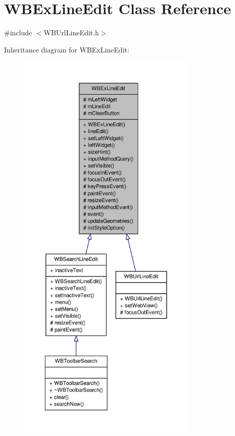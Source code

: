 \hypertarget{class_w_b_ex_line_edit}{\section{W\-B\-Ex\-Line\-Edit Class Reference}
\label{d6/dbb/class_w_b_ex_line_edit}
}


{\ttfamily \#include $<$W\-B\-Url\-Line\-Edit.\-h$>$}



Inheritance diagram for W\-B\-Ex\-Line\-Edit\-:
\nopagebreak
\begin{figure}[H]
\begin{center}
\leavevmode
\includegraphics[height=550pt]{d8/d8d/class_w_b_ex_line_edit__inherit__graph}
\end{center}
\end{figure}


